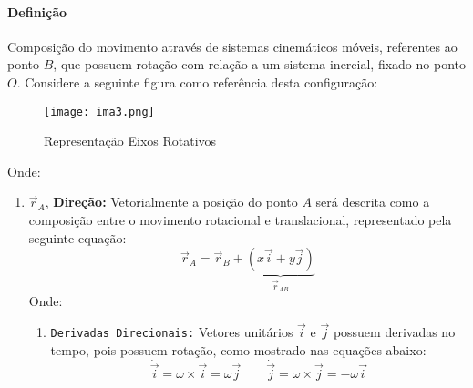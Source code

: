 \documentclass{article}
\begin{document}
            \paragraph{Definição}Composição do movimento através de sistemas cinemáticos móveis, referentes ao ponto $B$, que possuem rotação com relação a um sistema inercial, fixado no ponto $O$. Considere a seguinte figura como referência desta configuração:
                \begin{figure}[H]
                    \centering
                    \texttt{[image: ima3.png]}
                    \caption{Representação Eixos Rotativos}
                \end{figure} \noindent
            Onde:
                \begin{enumerate}[rightmargin = \leftmargin]
                    \item $\vec{r}_{A}$, \textbf{Direção:} Vetorialmente a posição do ponto $A$ será descrita como a composição entre o movimento rotacional e translacional, representado pela seguinte equação:
                        \begin{equation}
                            \boxed{
                                \vec{r}_{A} = 
                                \vec{r}_{B} + 
                                \underbrace{
                                    (x\vec{i} + y\vec{j})
                                }_{\vec{r}_{AB}}
                            }
                        \end{equation}
                    Onde:
                        \begin{enumerate}[rightmargin = \leftmargin]
                            \item \texttt{Derivadas Direcionais:} Vetores unitários $\vec{i}$ e $\vec{j}$ possuem derivadas no tempo, pois possuem rotação, como mostrado nas equações abaixo:
                                \begin{equation}
                                    \boxed{
                                        \dot{\vec{i}} = \omega\times\vec{i} = \omega\vec{j}
                                    }
                                    \qquad
                                    \boxed{
                                        \dot{\vec{j}} = \omega\times\vec{j} = -\omega\vec{i}
                                    }
                                \end{equation}\noindent
                        \end{enumerate}


\end{enumerate}
\end{document}
